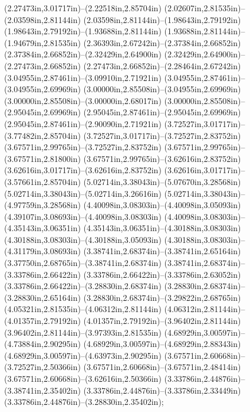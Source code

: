 (2.27473in,3.01717in)--(2.22518in,2.85704in) (2.02607in,2.81535in)--(2.03598in,2.81144in) (2.03598in,2.81144in)--(1.98643in,2.79192in) (1.98643in,2.79192in)--(1.93688in,2.81144in) (1.93688in,2.81144in)--(1.94679in,2.81535in) (2.36393in,2.67242in)--(2.37384in,2.66852in) (2.37384in,2.66852in)--(2.32429in,2.64900in) (2.32429in,2.64900in)--(2.27473in,2.66852in) (2.27473in,2.66852in)--(2.28464in,2.67242in) (3.04955in,2.87461in)--(3.09910in,2.71921in) (3.04955in,2.87461in)--(3.04955in,2.69969in) (3.00000in,2.85508in)--(3.04955in,2.69969in) (3.00000in,2.85508in)--(3.00000in,2.68017in) (3.00000in,2.85508in)--(2.95045in,2.69969in) (2.95045in,2.87461in)--(2.95045in,2.69969in) (2.95045in,2.87461in)--(2.90090in,2.71921in) (3.72527in,3.01717in)--(3.77482in,2.85704in) (3.72527in,3.01717in)--(3.72527in,2.83752in) (3.67571in,2.99765in)--(3.72527in,2.83752in) (3.67571in,2.99765in)--(3.67571in,2.81800in) (3.67571in,2.99765in)--(3.62616in,2.83752in) (3.62616in,3.01717in)--(3.62616in,2.83752in) (3.62616in,3.01717in)--(3.57661in,2.85704in) (5.02714in,3.38043in)--(5.07670in,3.28568in) (5.02714in,3.38043in)--(5.02714in,3.26616in) (5.02714in,3.38043in)--(4.97759in,3.28568in) (4.40098in,3.08303in)--(4.40098in,3.05093in) (4.39107in,3.08693in)--(4.40098in,3.08303in) (4.40098in,3.08303in)--(4.35143in,3.06351in) (4.35143in,3.06351in)--(4.30188in,3.08303in) (4.30188in,3.08303in)--(4.30188in,3.05093in) (4.30188in,3.08303in)--(4.31179in,3.08693in) (3.38741in,2.68374in)--(3.38741in,2.65164in) (3.37750in,2.68765in)--(3.38741in,2.68374in) (3.38741in,2.68374in)--(3.33786in,2.66422in) (3.33786in,2.66422in)--(3.33786in,2.63052in) (3.33786in,2.66422in)--(3.28830in,2.68374in) (3.28830in,2.68374in)--(3.28830in,2.65164in) (3.28830in,2.68374in)--(3.29822in,2.68765in) (4.05321in,2.81535in)--(4.06312in,2.81144in) (4.06312in,2.81144in)--(4.01357in,2.79192in) (4.01357in,2.79192in)--(3.96402in,2.81144in) (3.96402in,2.81144in)--(3.97393in,2.81535in) (4.68929in,3.00597in)--(4.73884in,2.90295in) (4.68929in,3.00597in)--(4.68929in,2.88343in) (4.68929in,3.00597in)--(4.63973in,2.90295in) (3.67571in,2.60668in)--(3.72527in,2.50366in) (3.67571in,2.60668in)--(3.67571in,2.48414in) (3.67571in,2.60668in)--(3.62616in,2.50366in) (3.33786in,2.44876in)--(3.38741in,2.35402in) (3.33786in,2.44876in)--(3.33786in,2.33449in) (3.33786in,2.44876in)--(3.28830in,2.35402in);

